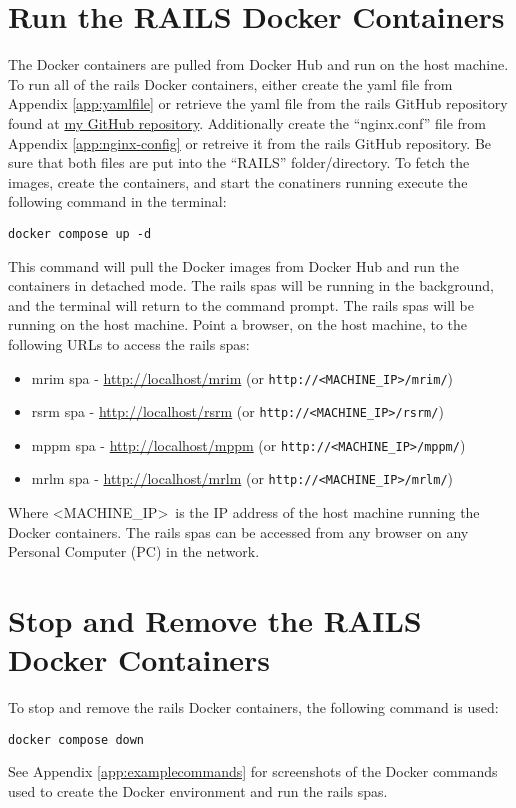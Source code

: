 \section{Run the RAILS Docker Containers}
\label{sec:railsdockercontainers}
The Docker containers are pulled from Docker Hub and run on the host machine. To run all of the \gls{rails} Docker containers, either create the \gls{yaml} file from Appendix \ref{app:yamlfile} or retrieve the \gls{yaml} file from the \gls{rails} GitHub repository found at \href{https://github.com/djbristow/RAILS/tree/master/Docker%20Based}{my GitHub repository}. Additionally create the ``nginx.conf'' file from Appendix \ref{app:nginx-config} or retreive it from the \gls{rails} GitHub repository. Be sure that both files are put into the ``RAILS'' folder/directory. 
To fetch the images, create the containers, and start the conatiners running execute the following command in the terminal:
\begin{verbatim}
docker compose up -d
\end{verbatim}
This command will pull the Docker images from Docker Hub and run the containers in detached mode. The \gls{rails} \glspl{spa} will be running in the background, and the terminal will return to the command prompt.
The \gls{rails} \glspl{spa} will be running on the host machine.
Point a browser, on the host machine, to the following URLs to access the \gls{rails} \glspl{spa}:
\begin{itemize}
    \item \gls{mrim} \gls{spa} - \href{http://localhost/mrim}{http://localhost/mrim} (or \texttt{http://\textless MACHINE\_IP\textgreater /mrim/})
    \item \gls{rsrm} \gls{spa} - \href{http://localhost/rsrm}{http://localhost/rsrm} (or \texttt{http://\textless MACHINE\_IP\textgreater /rsrm/})
    \item \gls{mppm} \gls{spa} - \href{http://localhost/mppm}{http://localhost/mppm} (or \texttt{http://\textless MACHINE\_IP\textgreater /mppm/})
    \item \gls{mrlm} \gls{spa} - \href{http://localhost/mrlm}{http://localhost/mrlm} (or \texttt{http://\textless MACHINE\_IP\textgreater /mrlm/})
\end{itemize}
Where \textless MACHINE\_IP\textgreater\ is the IP address of the host machine running the Docker containers. The \gls{rails} \glspl{spa} can be accessed from any browser on any Personal Computer (PC) in the network.
\section{Stop and Remove the RAILS Docker Containers}
\label{sec:stopremoverailsdockercontainers}
To stop and remove the \gls{rails} Docker containers, the following command is used:
\begin{verbatim}
docker compose down
\end{verbatim}

See Appendix \ref{app:examplecommands} for screenshots of the Docker commands used to create the Docker environment and run the \gls{rails} \glspl{spa}.
